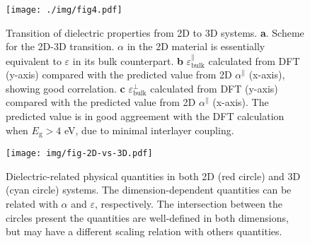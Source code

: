\documentclass[journal=ancac3,manuscript=article,email=true,hyperref=true,keywords=false]{achemso}
\begin{document}

\begin{figure}[htbp]
\centering
\texttt{[image: ./img/fig4.pdf]}
\caption{\label{fig-4} Transition of dielectric properties from 2D to
  3D systems. \textbf{a}. Scheme for the 2D-3D transition. $\alpha$ in
  the 2D material is essentially equivalent to $\varepsilon$ in its
  bulk counterpart. \textbf{b}
  $\varepsilon_{\mathrm{bulk}}^{\parallel}$ calculated from DFT
  (y-axis) compared with the predicted value from 2D
  $\alpha^{\parallel}$ (x-axis), showing good correlation. \textbf{c}
  $\varepsilon_{\mathrm{bulk}}^{\perp}$ calculated from DFT (y-axis)
  compared with the predicted value from 2D $\alpha^{\parallel}$
  (x-axis). The predicted value is in good aggreement with the DFT
  calculation when $E_{\mathrm{g}}>4$ eV, due to minimal interlayer
  coupling. }
\end{figure}

\begin{figure}[htbp]
\centering
\texttt{[image: img/fig-2D-vs-3D.pdf]}
\caption{\label{fig-2D-3D} Dielectric-related physical quantities in
  both 2D (red circle) and 3D (cyan circle) systems. The
  dimension-dependent quantities can be related with $\alpha$ and
  $\varepsilon$, respectively. The intersection between the circles
  present the quantities are well-defined in both dimensions, but may have a
  different scaling relation with others quantities.}
\end{figure}
\end{document}
